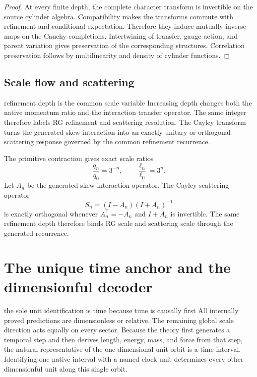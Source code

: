\documentclass[11pt]{article}
\numberwithin{equation}{section}
\theoremstyle{remark}
\begin{document}
\begin{proof}
At every finite depth, the complete character transform is invertible on the source cylinder algebra. Compatibility makes the transforms commute with refinement and conditional expectation. Therefore they induce mutually inverse maps on the Cauchy completions. Intertwining of transfer, gauge action, and parent variation gives preservation of the corresponding structures. Correlation preservation follows by multilinearity and density of cylinder functions.
\end{proof}

\subsection{Scale flow and scattering}
\begin{interpretivebridge}{refinement depth is the common scale variable}
Increasing depth changes both the native momentum ratio and the interaction transfer operator. The same integer therefore labels RG refinement and scattering resolution. The Cayley transform turns the generated skew interaction into an exactly unitary or orthogonal scattering response governed by the common refinement recurrence.
\end{interpretivebridge}

The primitive contraction gives exact scale ratios
\begin{equation}
\frac{q_n}{q_0}=3^{-n},\qquad
\frac{\ell_n}{\ell_0}=3^n.
\end{equation}
Let $A_n$ be the generated skew interaction operator. The Cayley scattering operator
\begin{equation}
S_n=(I-A_n)(I+A_n)^{-1}
\end{equation}
is exactly orthogonal whenever $A_n^{\mathsf T}=-A_n$ and $I+A_n$ is invertible. The same refinement depth therefore binds RG scale and scattering scale through the generated recurrence.

\section{The unique time anchor and the dimensionful decoder}
\begin{conceptledger}{the sole unit identification is time because time is causally first}
All internally proved predictions are dimensionless or relative. The remaining global scale direction acts equally on every sector. Because the theory first generates a temporal step and then derives length, energy, mass, and force from that step, the natural representative of the one-dimensional unit orbit is a time interval. Identifying one native interval with a named clock unit determines every other dimensionful unit along this single orbit.
\end{conceptledger}
\end{document}
